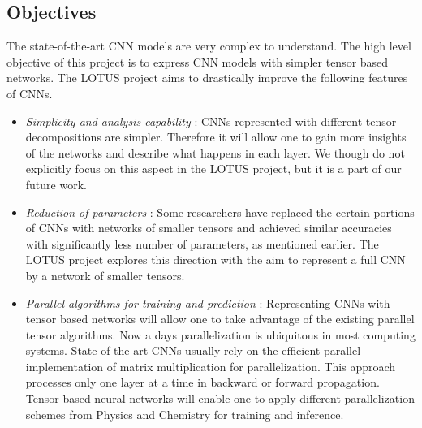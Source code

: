 \documentclass[11pt]{article}
\newcommand{\prname}{LOTUS\xspace}
\begin{document}
\subsection{Objectives}
The state-of-the-art CNN models are very complex to understand. The high level objective of this project is to express CNN models with simpler tensor based networks.  The \prname project aims to drastically improve the following features of CNNs.
\begin{itemize}
	\item \emph{Simplicity and analysis capability} :  CNNs represented with different tensor decompositions are simpler. Therefore it will allow one to gain more insights of the networks and describe what happens in each layer. We though do not explicitly focus on this aspect in the \prname project, but it is a part of our future work.
	\item \emph{Reduction of parameters} : Some researchers have replaced the certain portions of CNNs with  networks of smaller tensors and achieved  similar accuracies with significantly less number of parameters, as mentioned earlier. The \prname project explores this direction with the aim to represent a full CNN by a network of smaller tensors. 
	\item \emph{Parallel algorithms for training and prediction} : Representing CNNs with tensor based networks will allow one to take advantage of the existing parallel tensor algorithms. Now a days parallelization is ubiquitous in most computing systems. State-of-the-art CNNs usually rely on the efficient parallel implementation of matrix multiplication for parallelization. This approach processes only one layer at a time in backward or forward propagation. Tensor based neural networks will enable one to apply different parallelization schemes from Physics and Chemistry for training and inference.
\end{itemize}
\end{document}
